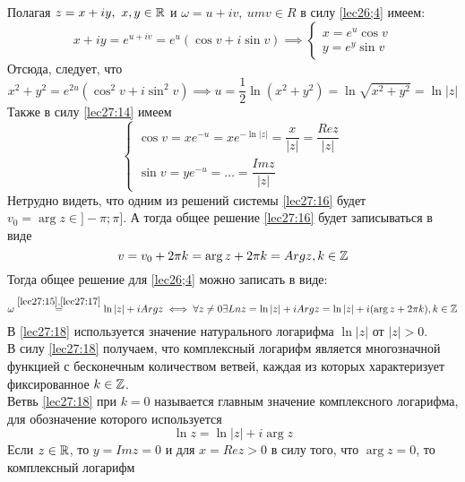 \documentclass[../../main.tex]{subfiles}
\begin{document}
Полагая $ z = x + iy,\ x, y \in \mathbb{R} $ и $ \omega = u + iv,\ um v \in R $
в силу \eqref{lec26;4} имеем:
\begin{equation}
\label{lec27:14}
x + iy = e^{u + iv} = e^u(\cos v + i\sin v) \implies
\begin{cases}
	x = e^u\cos v\\
	y = e^y\sin v
\end{cases}
\end{equation}
Отсюда, следует, что 
\begin{equation}
\label{lec27:15}
x^2 + y^2 = e^{2u}
(\cos^2 v + i\sin^2 v) \implies 
u = \dfrac{1}{2} \ln(x^2 + y^2) = 
\ln \sqrt{x^2 + y^2} = \ln|z|
\end{equation}
Также в силу \eqref{lec27:14} имеем
\begin{equation}
\label{lec27:16}
\begin{cases}
\cos v = xe^{-u} = xe^{-\ln|z|} = \dfrac{x}{|z|} = \dfrac{Re z}{|z|}\\
\sin v = ye^{-u} = \dots = \dfrac{Im z}{|z|}
\end{cases}
\end{equation}
Нетрудно видеть, что одним из решений системы \eqref{lec27:16} будет 
$ v_0 = \arg z \in ]-\pi; \pi] $. А тогда общее решение \eqref{lec27:16}
будет записываться в виде
\begin{equation}
\label{lec27:17}
v = v_0 + 2\pi k = \arg z + 2\pi k = Arg z, k \in \mathbb{Z}
\end{equation}
Тогда общее решение для \eqref{lec26;4} можно записать в виде:
\begin{equation}
\label{lec27:18}
\omega 
\stackrel{\eqref{lec27:15}, \eqref{lec27:17}}{=}
\ln |z| + i Arg z \iff
\forall z \neq 0 \exists Ln z = \ln |z| + i Arg z = 
\ln |z| + i(\arg z + 2\pi k), k \in \mathbb{Z}
\end{equation}
В \eqref{lec27:18} используется значение натурального логарифма
$ \ln|z| $ от $ |z| > 0 $.\\
В силу \eqref{lec27:18} получаем, что комплексный логарифм является 
многозначной функцией с бесконечным количеством ветвей, каждая из которых
характеризует фиксированное $ k\in\mathbb{Z} $.\\
Ветвь \eqref{lec27:18} при $ k = 0 $ называется главным значение комплексного
логарифма, для обозначение которого используется 
\begin{equation}
\label{lec27:19}
\ln z = \ln|z| + i\arg z
\end{equation}
Если $ z \in \mathbb{R} $, то $ y = Im z = 0 $ и для 
$ x = Re z > 0 $ в силу того, что $ \arg z = 0 $, то комплексный логарифм
\end{document}

